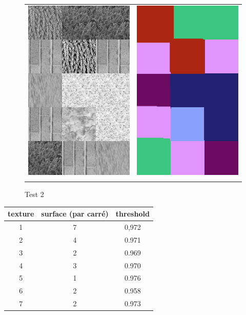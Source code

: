 \begin{figure}[htbp]
\centering
\begin{tabular}{cc}
\centering
\includegraphics[width=6cm,]{Figures/chap3/texture2.png}
&
\includegraphics[width=6cm,]{Figures/chap3/texture2c.png}\\
&
\end{tabular}
\caption[test2]{Test 2\\}
\end{figure}

\begin{center}
\begin{tabular}{ | c c c | }
	\hline                       
	texture & surface (par carré) & threshold\\
	\hline                       
	  1 & 7 & 0,972    \\
	  2 & 4 & 0.971  \\
	  3 & 2 & 0.969  \\
  	  4 & 3 & 0.970 \\
	  5 & 1 & 0.976\\
	  6 & 2 & 0.958 \\
  	  7 & 2 & 0.973 \\
	\hline                       
\end{tabular}
\end{center}

